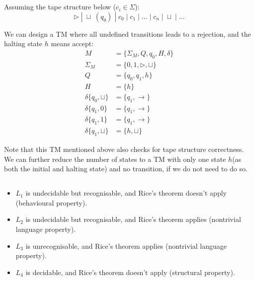 \documentclass[12pt]{article}
\begin{document}
\section{}

\subsection{}

Assuming the tape structure below ($c_i \in \Sigma$):
$$
\triangleright \;|\; \sqcup\;(q_0) \;|\; c_0 \;|\; c_1 \;|\; ... \;|\; c_n \;|\; \sqcup \;|\; ...
$$

We can design a TM where all undefined transitions leads to a rejection, and the halting state $h$ means accept:
$$ 
\begin{aligned}
M &= \{\Sigma_M, Q, q_0, H, \delta\} \\
\Sigma_M & = \{0, 1, \triangleright, \sqcup\} \\
Q & = \{q_0, q_1, h\} \\
H & = \{h\} \\
\delta\{q_0, \sqcup\} & = \{q_1, \rightarrow\} \\
\delta\{q_1, 0\} & = \{q_1, \rightarrow\} \\
\delta\{q_1, 1\} & = \{q_1, \rightarrow\} \\
\delta\{q_1, \sqcup\} &= \{h, \sqcup\}
\end{aligned}
$$

Note that this TM mentioned above also checks for tape structure correctness. We can further reduce the number of states to a TM with only one state $h$(as both the initial and halting state) and no transition, if we do not need to do so.

\subsection{}
\begin{itemize}
    \item $L_1$ is undecidable but recognisable, and Rice's theorem doesn't apply (behavioural property).
    \item $L_2$ is undecidable but recognisable, and Rice's theorem applies (nontrivial language property).
    \item $L_3$ is unrecognisable, and Rice's theorem applies (nontrivial language property).
    \item $L_4$ is decidable, and Rice's theorem doesn't apply (structural property).
\end{itemize}
\end{document}
